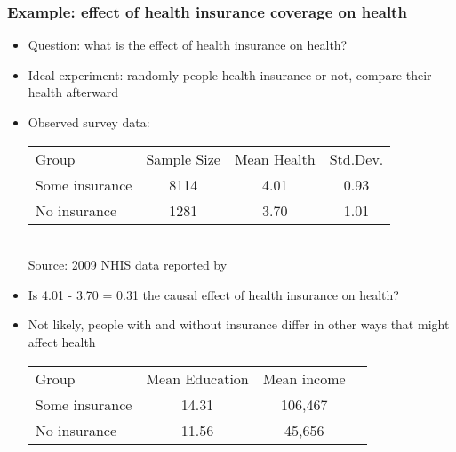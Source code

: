 
\begin{frame}[allowframebreaks]\frametitle{Example: effect of health insurance coverage on health}
  \begin{itemize}
  \item Question: what is the effect of health insurance on health?
  \item Ideal experiment: randomly people health insurance or not,
    compare their health afterward
  \item Observed survey data: \\
    \begin{tabular}{lccc} 
      \hline
      Group & Sample Size & Mean Health & Std.Dev. \\
      Some insurance & 8114 & 4.01 & 0.93 \\
      No insurance & 1281 & 3.70 & 1.01 \\ 
      \hline
    \end{tabular} \\
    {\footnotesize{Source: 2009 NHIS data reported by \cite{ap2014}}}
  \item Is 4.01 - 3.70 = 0.31 the causal effect of health insurance
    on health?
  \item Not likely, people with and without insurance differ in other
    ways that might affect health
    \begin{tabular}{lccc} 
      \hline
      Group &  Mean Education & Mean income \\
      Some insurance & 14.31 & 106,467  \\
      No insurance & 11.56 &  45,656 \\ 
      \hline
    \end{tabular} \\
  \end{itemize}
\end{frame}

